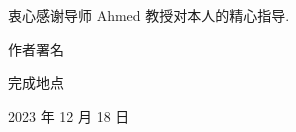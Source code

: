 \begin{acknowledgement}
  衷心感谢导师 Ahmed 教授对本人的精心指导. 

  \vspace{50bp}

  \hfill 作者署名

  \hfill 完成地点

  \hfill 2023 年 12 月 18 日

\end{acknowledgement}
